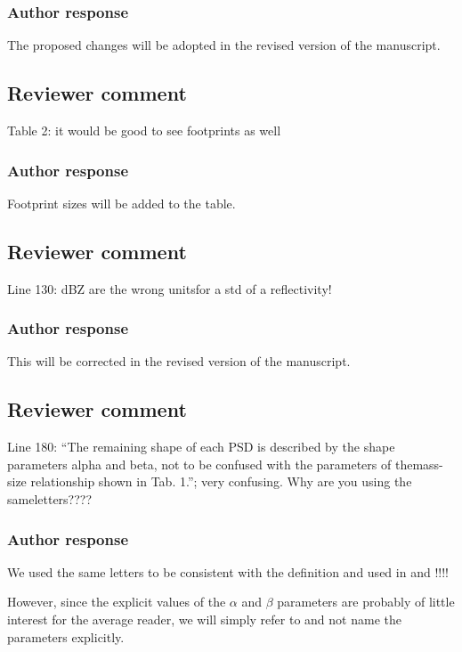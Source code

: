 \documentclass[11pt]{scrartcl}
\begin{document}
\subsubsection*{Author response}

The proposed changes will be adopted in the revised version of the manuscript.

\subsection*{Reviewer comment}

Table 2:  it would be good to see footprints as well

\subsubsection*{Author response}
Footprint sizes will be added to the table.

\subsection*{Reviewer comment}
Line 130: dBZ are the wrong unitsfor a std of a reflectivity!

\subsubsection*{Author response}
This will be corrected in the revised version of the manuscript.

\subsection*{Reviewer comment}

Line 180: “The remaining shape of each PSD is described by the shape parameters
alpha and beta, not to be confused with the parameters of themass-size
relationship shown in Tab. 1.”; very confusing. Why are you using the
sameletters????

\subsubsection*{Author response}

We used the same  letters to be consistent with the definition and used in
\cite{delanoe14} and \cite{cazenave18}!!!!

However, since the explicit values of the $\alpha$ and $\beta$ parameters are
probably of little interest for the average reader, we will simply refer to
\cite{cazenave18} and not name the parameters explicitly.
\end{document}
